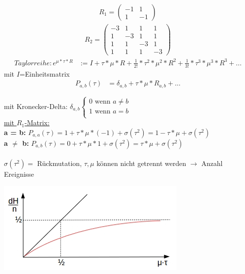 \begin{align*}
	R_1 = \begin{pmatrix}
		-1 & 1\\
		 1 &-1
	\end{pmatrix}
\end{align*}
\begin{align*}
	R_2 = \begin{pmatrix}
		-3 & 1 & 1 & 1\\
		 1 &-3 & 1 & 1\\
		 1 & 1 &-3 & 1\\
		 1 & 1 & 1 &-3
	\end{pmatrix}
\end{align*}
\begin{align*}
	Taylorreihe: e^{\mu * \tau * R} &:= I + \tau * \mu * R + \frac{1}{2!} * \tau^2 * \mu^2 * R^2 + \frac{1}{3!} * \tau^3 * \mu^3 * R^3 + ...
\end{align*}
mit $I$=Einheitsmatrix
\begin{align*}
	P_{a,b}(\tau) &= \delta_{a,b} + \tau * \mu * R_{a,b} + ...
\end{align*}

mit Kronecker-Delta: $\delta_{a,b}
\begin{cases}
	0 \text{ wenn } a\neq b\\
	1 \text{ wenn } a = b\\
\end{cases}
$
\\
\underline{mit $R_1$-Matrix:}\\
\textbf{a = b:} $P_{a,a}(\tau) = 1 + \tau * \mu * (-1) + \sigma (\tau ^2) = 1 - \tau * \mu + \sigma (\tau ^2)$\\
\textbf{a $\neq$ b:} $P_{a,b}(\tau) = 0 + \tau * \mu * 1 + \sigma (\tau ^2) = \tau * \mu + \sigma (\tau ^2)$
\\\\
$\sigma (\tau ^2) = $ Rückmutation, $\tau, \mu$ können nicht getrennt werden $\rightarrow$ Anzahl Ereignisse
 
\begin{center}
	\includegraphics[scale=1.2]{lectures/161209/pix/pic4.jpg}
\end{center}

